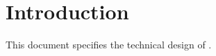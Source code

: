 
\chapter{Introduction}
\label{sec:Introduction}

This document specifies the technical design of \LibName{} \LibVersion{}.

%
%
